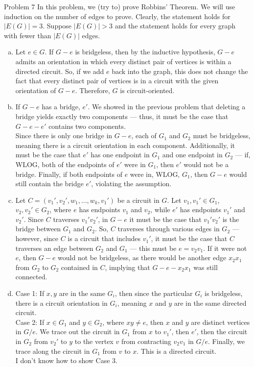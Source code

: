 \documentclass[8pt]{extarticle}
\begin{document}
  \begin{problem}{Problem 7}
    In this problem, we (try to) prove Robbins' Theorem.
    \tcblower
    We will use induction on the number of edges to prove. Clearly, the statement holds for $|E(G)| = 3$. Suppose $|E(G)| > 3$ and the statement holds for every graph with fewer than $|E(G)|$ edges.
    \begin{enumerate}[(a)]
      \item Let $e\in G$. If $G-e$ is bridgeless, then by the inductive hypothesis, $G-e$ admits an orientation in which every distinct pair of vertices is within a directed circuit. So, if we add $e$ back into the graph, this does not change the fact that every distinct pair of vertices is in a circuit with the given orientation of $G-e$. Therefore, $G$ is circuit-oriented.
      \item If $G-e$ has a bridge, $e'$. We showed in the previous problem that deleting a bridge yields exactly two components --- thus, it must be the case that $G-e-e'$ contains two components.\\

        Since there is only one bridge in $G-e$, each of $G_1$ and $G_2$ must be bridgeless, meaning there is a circuit orientation in each component. Additionally, it must be the case that $e'$ has one endpoint in $G_1$ and one endpoint in $G_2$ --- if, WLOG, both of the endpoints of $e'$ were in $G_1$, then $e'$ would not be a bridge. Finally, if both endpoints of $e$ were in, WLOG, $G_1$, then $G-e$ would still contain the bridge $e'$, violating the assumption.
      \item Let $C = (v_1',v_2',w_1,\dots,w_k,v_1')$ be a circuit in $G$. Let $v_1,v_1'\in G_1$, $v_2,v_2'\in G_2$, where $e$ has endpoints $v_1$ and $v_2$, while $e'$ has endpoints $v_1'$ and $v_2'$. Since $C$ traverses $v_1'v_2'$, in $G - e$ it must be the case that $v_1'v_2'$ is the bridge between $G_1$ and $G_2$. So, $C$ traverses through various edges in $G_2$ --- however, since $C$ is a circuit that includes $v_1'$, it must be the case that $C$ traverses an edge between $G_2$ and $G_1$ --- this must be $e = v_2v_1$. If it were not $e$, then $G - e$ would not be bridgeless, as there would be another edge $x_2x_1$ from $G_2$ to $G_2$ contained in $C$, implying that $G - e - x_2x_1$ was still connected.
      \item Case 1: If $x,y$ are in the same $G_i$, then since the particular $G_i$ is bridgeless, there is a circuit orientation in $G_i$, meaning $x$ and $y$ are in the same directed circuit.\\

        Case 2: If $x\in G_1$ and $y\in G_2$, where $xy\neq e$, then $x$ and $y$ are distinct vertices in $G/e$. We trace out the circuit in $G_1$ from $x$ to $v_1'$, then $e'$, then the circuit in $G_2$ from $v_2'$ to $y$ to the vertex $v$ from contracting $v_2v_1$ in $G/e$. Finally, we trace along the circuit in $G_1$ from $v$ to $x$. This is a directed circuit.\\

        I don't know how to show Case 3.
    \end{enumerate}
  \end{problem}
\end{document}

